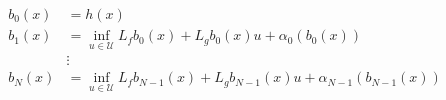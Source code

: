 \documentclass[preview]{standalone}
\begin{document}
\begin{align*}
b_0(x) &= h(x)\\ b_1(x) &= \inf_{u \in \mathcal{U}}  L_fb_0 (x)  +  L_gb_0 (x) u +  \alpha_0(b_0 (x) ) \\ &\vdots\\ b_N(x) &= \inf_{u \in \mathcal{U}}  L_fb_{N-1 } (x)  +  L_gb_{N-1 } (x)  u +  \alpha_{N-1}(b_{N-1 } (x) )
\end{align*}
\end{document}
